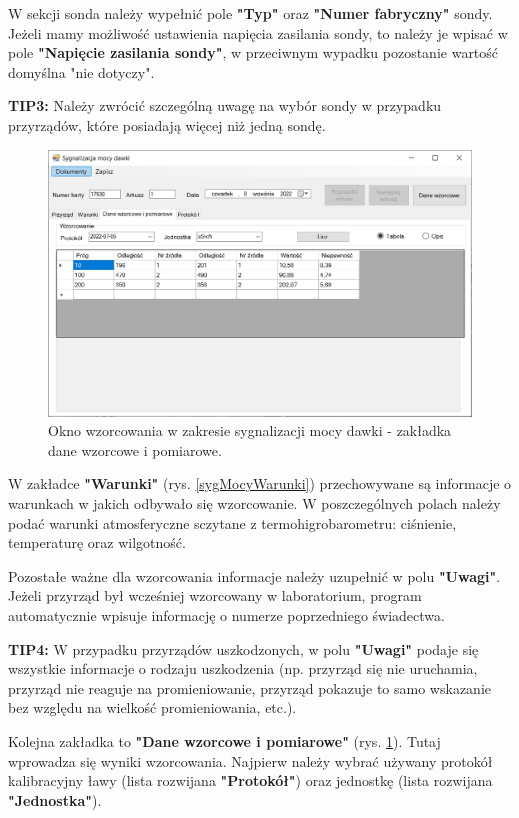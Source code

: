{{	W sekcji sonda należy wypełnić pole \textbf{"Typ"} oraz \textbf{"Numer fabryczny"} sondy. Jeżeli mamy możliwość ustawienia napięcia zasilania sondy, to należy je wpisać w pole \textbf{"Napięcie zasilania sondy"}, w przeciwnym wypadku pozostanie wartość domyślna "nie dotyczy".
	
	\textbf{TIP3:} Należy zwrócić szczególną uwagę na wybór sondy w przypadku przyrządów, które posiadają więcej niż jedną sondę.
	
	\begin{figure}[htb]
	\centering
	\includegraphics[width=\columnwidth]{obrazki/Wzorcowanie/syg_mocy_dawki/dane.png}
	\caption{Okno wzorcowania w zakresie sygnalizacji mocy dawki - zakładka dane wzorcowe i pomiarowe.}
	\label{sygMocyDane}
	\end{figure}
	
	W zakładce \textbf{"Warunki"} (rys. \ref{sygMocyWarunki}) przechowywane są informacje o warunkach w jakich odbywało się wzorcowanie. W poszczególnych polach należy podać warunki atmosferyczne sczytane z termohigrobarometru: ciśnienie, temperaturę oraz wilgotność.
	
	Pozostałe ważne dla wzorcowania informacje należy uzupełnić w polu \textbf{"Uwagi"}. Jeżeli przyrząd był wcześniej wzorcowany w laboratorium, program automatycznie wpisuje informację o numerze poprzedniego świadectwa. 
	
	\textbf{TIP4:} W przypadku przyrządów uszkodzonych, w polu \textbf{"Uwagi"} podaje się wszystkie informacje o rodzaju uszkodzenia (np. przyrząd się nie uruchamia, przyrząd nie reaguje na promieniowanie, przyrząd pokazuje to samo wskazanie bez względu na wielkość promieniowania, etc.).

	Kolejna zakładka to \textbf{"Dane wzorcowe i pomiarowe"} (rys. \ref{sygMocyDane}). Tutaj wprowadza się wyniki wzorcowania. Najpierw należy wybrać używany protokół kalibracyjny ławy (lista rozwijana \textbf{"Protokół"}) oraz jednostkę (lista rozwijana \textbf{"Jednostka"}).
	
}}
